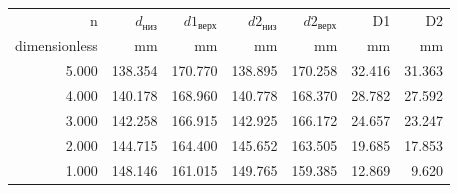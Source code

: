 \begin{table}[H]
    \begin{tabular}{rrrrrrr}
        \toprule
        n             & $d_\text{низ}$      & $d1_\text{верх}$    & $d2_\text{низ}$     & $d2_\text{верх}$    & D1                  & D2                  \\
        dimensionless & \si[]{\milli\meter} & \si[]{\milli\meter} & \si[]{\milli\meter} & \si[]{\milli\meter} & \si[]{\milli\meter} & \si[]{\milli\meter} \\
        \midrule
        5.000         & 138.354             & 170.770             & 138.895             & 170.258             & 32.416              & 31.363              \\
        4.000         & 140.178             & 168.960             & 140.778             & 168.370             & 28.782              & 27.592              \\
        3.000         & 142.258             & 166.915             & 142.925             & 166.172             & 24.657              & 23.247              \\
        2.000         & 144.715             & 164.400             & 145.652             & 163.505             & 19.685              & 17.853              \\
        1.000         & 148.146             & 161.015             & 149.765             & 159.385             & 12.869              & 9.620               \\
        \bottomrule
    \end{tabular}
\end{table}

